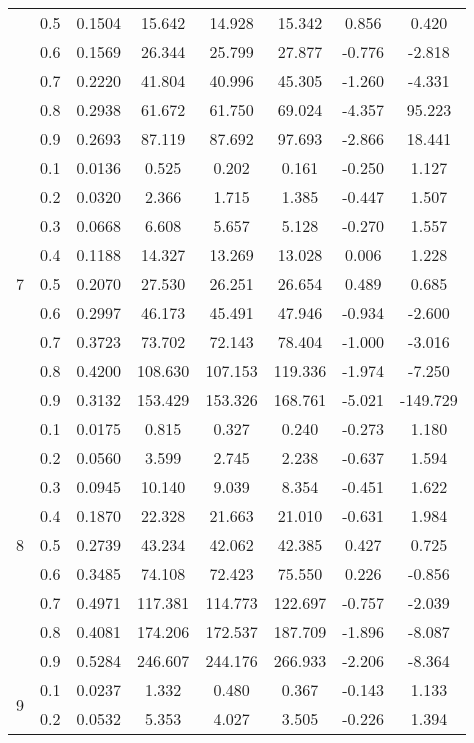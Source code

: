 \documentclass[11pt,a4paper]{report}
\begin{document}
\begin{longtable}{ | c | c || c | c | c | c | c | c | }
 & 0.5 & 0.1504 & 15.642 & 14.928 & 15.342 & 0.856 & 0.420 \\
 & 0.6 & 0.1569 & 26.344 & 25.799 & 27.877 & -0.776 & -2.818 \\
 & 0.7 & 0.2220 & 41.804 & 40.996 & 45.305 & -1.260 & -4.331 \\
 & 0.8 & 0.2938 & 61.672 & 61.750 & 69.024 & -4.357 & 95.223 \\
 & 0.9 & 0.2693 & 87.119 & 87.692 & 97.693 & -2.866 & 18.441 \\
 \hline
\multirow{9}{*}{7} & 0.1 & 0.0136 & 0.525 & 0.202 & 0.161 & -0.250 & 1.127 \\
 & 0.2 & 0.0320 & 2.366 & 1.715 & 1.385 & -0.447 & 1.507 \\
 & 0.3 & 0.0668 & 6.608 & 5.657 & 5.128 & -0.270 & 1.557 \\
 & 0.4 & 0.1188 & 14.327 & 13.269 & 13.028 & 0.006 & 1.228 \\
 & 0.5 & 0.2070 & 27.530 & 26.251 & 26.654 & 0.489 & 0.685 \\
 & 0.6 & 0.2997 & 46.173 & 45.491 & 47.946 & -0.934 & -2.600 \\
 & 0.7 & 0.3723 & 73.702 & 72.143 & 78.404 & -1.000 & -3.016 \\
 & 0.8 & 0.4200 & 108.630 & 107.153 & 119.336 & -1.974 & -7.250 \\
 & 0.9 & 0.3132 & 153.429 & 153.326 & 168.761 & -5.021 & -149.729 \\
 \hline
\multirow{9}{*}{8} & 0.1 & 0.0175 & 0.815 & 0.327 & 0.240 & -0.273 & 1.180 \\
 & 0.2 & 0.0560 & 3.599 & 2.745 & 2.238 & -0.637 & 1.594 \\
 & 0.3 & 0.0945 & 10.140 & 9.039 & 8.354 & -0.451 & 1.622 \\
 & 0.4 & 0.1870 & 22.328 & 21.663 & 21.010 & -0.631 & 1.984 \\
 & 0.5 & 0.2739 & 43.234 & 42.062 & 42.385 & 0.427 & 0.725 \\
 & 0.6 & 0.3485 & 74.108 & 72.423 & 75.550 & 0.226 & -0.856 \\
 & 0.7 & 0.4971 & 117.381 & 114.773 & 122.697 & -0.757 & -2.039 \\
 & 0.8 & 0.4081 & 174.206 & 172.537 & 187.709 & -1.896 & -8.087 \\
 & 0.9 & 0.5284 & 246.607 & 244.176 & 266.933 & -2.206 & -8.364 \\
 \hline
\multirow{9}{*}{9} & 0.1 & 0.0237 & 1.332 & 0.480 & 0.367 & -0.143 & 1.133 \\
 & 0.2 & 0.0532 & 5.353 & 4.027 & 3.505 & -0.226 & 1.394 \\

\end{longtable}
\end{document}
